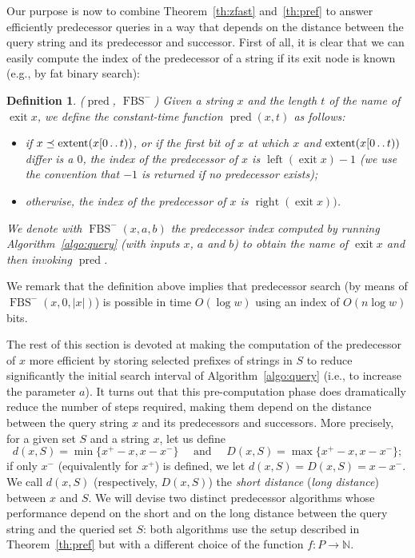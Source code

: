 \documentclass[a4paper,11pt]{article}
\newtheorem{definition}[theorem]{Definition}
\newcommand{\N}{\mathbb{N}}
\newcommand{\?}{\mskip1.5mu}
\def\..{\,\mathpunct{\ldotp\ldotp}} %
\DeclareMathOperator{\exit}{exit}
\DeclareMathOperator{\lrange}{left}
\DeclareMathOperator{\rrange}{right}
\DeclareMathOperator{\extent}{extent}
\DeclareMathOperator{\pred}{pred}
\DeclareMathOperator{\fbs}{FBS}
\begin{document}
Our purpose is now to combine Theorem~\ref{th:zfast} and~\ref{th:pref} to answer
efficiently predecessor queries in a way that depends on the distance
between the query string and its predecessor and successor. 
First of all, it is clear that we can easily compute the index of the 
predecessor of a string if its exit node is known (e.g., by fat binary search): 
\begin{definition}($\pred$, $\fbs^-$)
Given a string $x$ and the length $t$ of the name of $\exit x$, we define the constant-time function $\pred(x,t)$
as follows:
\begin{itemize}
  \item if $x \preceq \extent(x[0\..t))$, or if the first bit of $x$ at which $x$
  and $\extent(x[0\..t))$ differ is a $0$, 
  the index of the predecessor of $x$ is $\lrange(\exit x)-1$ (we use the
  convention that $-1$ is returned if no predecessor exists);
  \item otherwise, the index of the predecessor of $x$ is $\rrange(\exit x))$.
\end{itemize}
 We denote with $\fbs^-(x,a,b)$ the predecessor index computed by running Algorithm~\ref{algo:query} 
 (with inputs $x$, $a$ and $b$) to obtain the name of $\exit x$ and then invoking $\pred$.
\end{definition}
We remark that the definition above implies that predecessor search
(by means of $\fbs^-(x,0,|x|)$) is possible in time $O(\log w)$ using an index
of $O(n\log w)$ bits.

The rest of this section is devoted at making the computation of the
predecessor of $x$  
more efficient by storing selected prefixes of strings in $S$ 
to reduce significantly the initial search interval of
Algorithm~\ref{algo:query} (i.e., to increase the parameter $a$).
It turns out that this pre-computation phase does dramatically reduce the number
of steps required, making them depend on the distance between the query string
$x$ and its predecessors and successors. More precisely, for a given set $S$ and
a string $x$, let us define
\[
	d(x,S) = \min\{x^+-x,x-x^-\} \quad\text{ and }\quad
	D(x,S) = \max\{x^+-x,x-x^-\};	
\]
if only $x^-$ (equivalently for $x^+$) is defined, we let $d(x,S)=D(x,S)=x-x^-$.
We call $d(x,S)$ (respectively, $D(x,S)$) the \emph{short
distance} (\emph{long distance}) between $x$ and $S$. We will devise two
distinct predecessor algorithms whose performance depend on the short and on the
long distance between the query string and the queried set $S$:
both algorithms use the setup described in Theorem~\ref{th:pref} but with a
different choice of the function $f:P\to \N$. 
\end{document}
